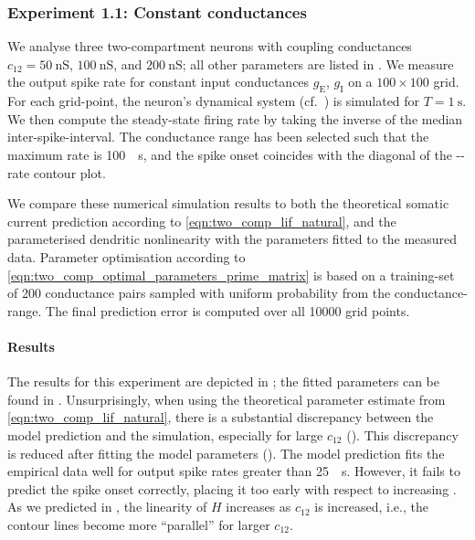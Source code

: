 \subsubsection{Experiment 1.1: Constant conductances}
We analyse three two-compartment \LIF neurons with coupling conductances $c_{12} = \SI{50}{\nano\siemens}$, $\SI{100}{\nano\siemens}$, and $\SI{200}{\nano\siemens}$; all other parameters are listed in .
We measure the output spike rate for constant input conductances $g_\mathrm{E}$, $g_\mathrm{I}$ on a $100 \times 100$ grid.
For each grid-point, the neuron's dynamical system (cf.~) is simulated for $T = \SI{1}{\second}$.
We then compute the steady-state firing rate by taking the inverse of the median inter-spike-interval.
The conductance range has been selected such that the maximum rate is \SI{100}{\per\second}, and the spike onset coincides with the diagonal of the \gE-\gI-rate contour plot.

We compare these numerical simulation results to both the theoretical somatic current prediction according to \cref{eqn:two_comp_lif_natural}, and the parameterised dendritic nonlinearity with the parameters fitted to the measured data.
Parameter optimisation according to \cref{eqn:two_comp_optimal_parameters_prime_matrix} is based on a training-set of \num{200} conductance pairs sampled with uniform probability from the conductance-range.
The final prediction error is computed over all \num{10000} grid points.

\pagebreak

\paragraph{Results}
The results for this experiment are depicted in ; the fitted parameters can be found in .
Unsurprisingly, when using the theoretical parameter estimate from \cref{eqn:two_comp_lif_natural}, there is a substantial discrepancy between the model prediction and the simulation, especially for large $c_{12}$ (). This discrepancy is reduced after fitting the model parameters ().
The model prediction fits the empirical data well for output spike rates greater than \SI{25}{\per\second}.
However, it fails to predict the spike onset correctly, placing it too early with respect to increasing \gE.
As we predicted in , the linearity of $H$ increases as $c_{12}$ is increased, i.e., the contour lines become more \enquote{parallel} for larger $c_{12}$.

